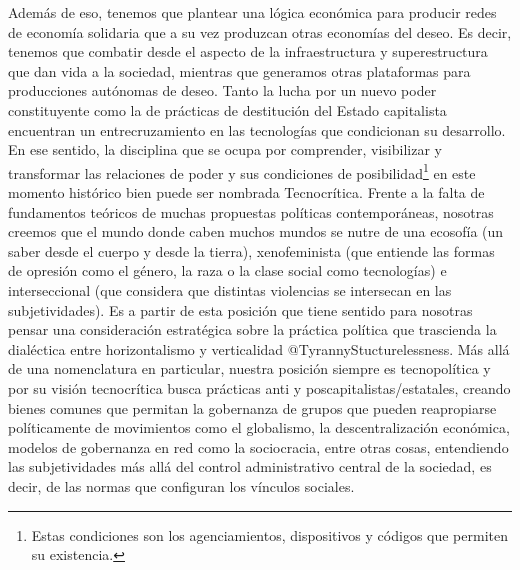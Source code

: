 Además de eso, tenemos que plantear una lógica económica para producir redes de economía solidaria que a su vez produzcan otras economías del deseo. Es decir, tenemos que combatir desde el aspecto de la infraestructura y superestructura que dan vida a la sociedad, mientras que generamos otras plataformas para producciones autónomas de deseo. Tanto la lucha por un nuevo poder constituyente como la de prácticas de destitución del Estado capitalista encuentran un entrecruzamiento en las tecnologías que condicionan su desarrollo. En ese sentido, la disciplina que se ocupa por comprender, visibilizar y transformar las relaciones de poder y sus condiciones de posibilidad\footnote{Estas condiciones son los agenciamientos, dispositivos y códigos que permiten su existencia.} en este momento histórico bien puede ser nombrada Tecnocrítica. Frente a la falta de fundamentos teóricos de muchas propuestas políticas contemporáneas, nosotras creemos que el mundo donde caben muchos mundos se nutre de una ecosofía (un saber desde el cuerpo y desde la tierra), xenofeminista (que entiende las formas de opresión como el género, la raza o la clase social como tecnologías) e interseccional (que considera que distintas violencias se intersecan en las subjetividades). Es a partir de esta posición que tiene sentido para nosotras pensar una consideración estratégica sobre la práctica política que trascienda la dialéctica entre horizontalismo y verticalidad @TyrannyStucturelessness. Más allá de una nomenclatura en particular, nuestra posición siempre es tecnopolítica y por su visión tecnocrítica busca prácticas anti y poscapitalistas/estatales, creando bienes comunes que permitan la gobernanza de grupos que pueden reapropiarse políticamente de movimientos como el globalismo, la descentralización económica, modelos de gobernanza en red como la sociocracia, entre otras cosas, entendiendo las subjetividades más allá del control administrativo central de la sociedad, es decir, de las normas que configuran los vínculos sociales.

